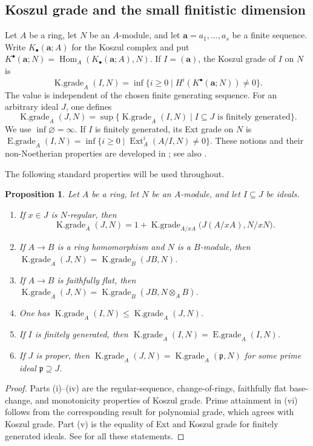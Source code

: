 \documentclass[11pt]{amsart}
\numberwithin{equation}{section}
\newtheorem{proposition}[theorem]{Proposition}
\theoremstyle{definition}
\theoremstyle{remark}
\newcommand{\Ext}{\operatorname{Ext}}
\newcommand{\Hom}{\operatorname{Hom}}
\newcommand{\Kgr}{\operatorname{K.grade}}
\newcommand{\Egr}{\operatorname{E.grade}}
\begin{document}
\subsection{Koszul grade and the small finitistic dimension}

Let $A$ be a ring, let $N$ be an $A$-module, and let $\mathbf a=a_1,\ldots,a_s$ be a finite sequence.  Write $K_\bullet(\mathbf a;A)$ for the Koszul complex and put $K^\bullet(\mathbf a;N)=\Hom_A(K_\bullet(\mathbf a;A),N)$.  If $I=(\mathbf a)$, the Koszul grade of $I$ on $N$ is
\[
 \Kgr_A(I,N)
 =\inf\{i\geq0\mid H^i(K^\bullet(\mathbf a;N))\neq0\}.
\]
The value is independent of the chosen finite generating sequence.  For an arbitrary ideal $J$, one defines
\[
 \Kgr_A(J,N)
 =\sup\{\Kgr_A(I,N)\mid I\subseteq J\text{ is finitely generated}\}.
\]
We use $\inf\varnothing=\infty$.  If $I$ is finitely generated, its Ext grade on $N$ is $\Egr_A(I,N)=\inf\{i\geq0\mid\Ext_A^i(A/I,N)\neq0\}$.  These notions and their non-Noetherian properties are developed in \cite{AsgharzadehTousi}; see also \cite[Sections~1.6 and~9.1]{BrunsHerzog}.

The following standard properties will be used throughout.

\begin{proposition}\label{prop:grade-properties}
Let $A$ be a ring, let $N$ be an $A$-module, and let $I\subseteq J$ be ideals.
\begin{enumerate}[label=\textup{(\roman*)}]
\item If $x\in J$ is $N$-regular, then
\[
 \Kgr_A(J,N)
 =1+\Kgr_{A/xA}\bigl(J(A/xA),N/xN\bigr).
\]
\item If $A\to B$ is a ring homomorphism and $N$ is a $B$-module, then $\Kgr_A(J,N)=\Kgr_B(JB,N)$.
\item If $A\to B$ is faithfully flat, then $\Kgr_A(J,N)=\Kgr_B(JB,N\otimes_A B)$.
\item One has $\Kgr_A(I,N)\leq\Kgr_A(J,N)$.
\item If $I$ is finitely generated, then $\Kgr_A(I,N)=\Egr_A(I,N)$.
\item If $J$ is proper, then $\Kgr_A(J,N)=\Kgr_A(\mathfrak p,N)$ for some prime ideal $\mathfrak p\supseteq J$.
\end{enumerate}
\end{proposition}

\begin{proof}
Parts (i)--(iv) are the regular-sequence, change-of-rings, faithfully flat base-change, and monotonicity properties of Koszul grade.  Prime attainment in (vi) follows from the corresponding result for polynomial grade, which agrees with Koszul grade.  Part (v) is the equality of Ext and Koszul grade for finitely generated ideals.  See \cite[Propositions~2.2 and~2.3]{AsgharzadehTousi} for all these statements.
\end{proof}
\end{document}
